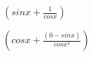 \documentclass{proc}
\begin{document}
$( sin x + \frac{ 1 }{cos x }) $

$( cos x + \frac{ ( 0 - sin x ) }{cos x ^ 2 }) $
\end{document}
